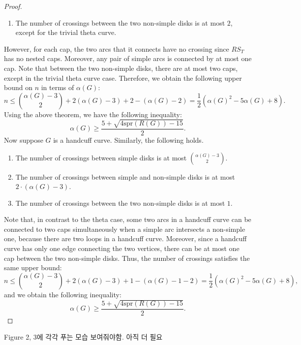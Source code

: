 \documentclass{article}
\theoremstyle{definition}
\theoremstyle{theorem}
\theoremstyle{proposition}
\theoremstyle{corollary}
\begin{document}
\begin{proof}
\begin{enumerate}
        \item The number of crossings between the two non-simple disks is at most $2$, except for the trivial theta curve.
    \end{enumerate}
    However, for each cap, the two arcs that it connects have no crossing since $RS_T$ has no nested caps. Moreover, any pair of simple arcs is connected by at most one cap. Note that between the two non-simple disks, there are at most two caps, except in the trivial theta curve case. Therefore, we obtain the following upper bound on $n$ in terms of $\alpha(G)$:
    \[ n \leq \binom{\alpha(G)-3}{2} + 2(\alpha(G)-3) + 2 - (\alpha(G)-2) = \frac{1}{2} (\alpha(G)^2 - 5 \alpha(G) + 8). \]
    Using the above theorem, we have the following inequality:
    \[ \alpha(G) \geq  \frac{5+\sqrt{4\mathrm{spr}(R(G))-15}}{2}. \]
    Now suppose $G$ is a handcuff curve. Similarly, the following holds.
    \begin{enumerate}
        \item The number of crossings between simple disks is at most $\binom{\alpha(G)-3}{2}$.
        \item The number of crossings between simple and non-simple disks is at most $2 \cdot (\alpha(G)-3)$.
        \item The number of crossings between the two non-simple disks is at most $1$.
    \end{enumerate}
    Note that, in contrast to the theta case, some two arcs in a handcuff curve can be connected to two caps simultaneously when a simple arc intersects a non-simple one, because there are two loops in a handcuff curve. Moreover, since a handcuff curve has only one edge connecting the two vertices, there can be at most one cap between the two non-simple disks. Thus, the number of crossings satisfies the same upper bound:
    \[ n \leq \binom{\alpha(G)-3}{2} + 2(\alpha(G)-3) + 1 - (\alpha(G)-1-2) = \frac{1}{2} (\alpha(G)^2 - 5 \alpha(G) + 8), \]
    and we obtain the following inequality:
    \[ \alpha(G) \geq  \frac{5+\sqrt{4\mathrm{spr}(R(G))-15}}{2}. \]
\end{proof}

Figure 2, 3에 각각 푸는 모습 보여줘야함. 아직 더 필요
\end{document}
